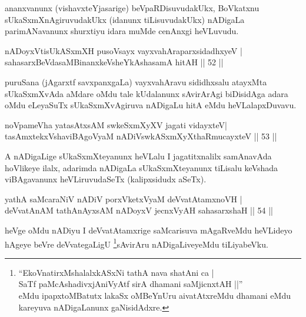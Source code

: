 \begin{artha}
ananxvanunx (vishavxteYjasarige) beVpaRDisuvudakUkx, BoVkatxnu sUkaSxmXnAgiruvudakUkx (idanunx tiLisuvudakUkx) nADigaLa parimANavanunx shurxtiyu idara muMde cenAnxgi heVLuvudu.
\end{artha}

\begin{shl}
nADoyxV\s tisUkASxmXH pusoV\s sayx vayxvahAraparxsidadhxyeV |\\
sahasarxBeVdasaMBinanxkeVsheYkAshasamA hitAH \hfill || 52 || 
\end{shl}

\begin{artha}
puruSana (jAgarxtf savxpanxgaLa) vayxvahAravu sididhxsalu atayxMta sUkaSxmXvAda aMdare oMdu tale kUdalanunx sAvirArAgi biDisidAga adara oMdu eLeyaSuTx sUkaSxmXvAgiruva nADigaLu hitA eMdu heVLalapxDuvavu.
\end{artha}

\begin{shl}
noVpameVha yatasAtxsAM swkeSxmXyXV jagati vidayxteV|\\
tasAmxtekxVshaviBAgoV\s yaM nADiVswkASxmXyXthaRmucayxteV \hfill || 53 || 
\end{shl}

\begin{artha}
A nADigaLige sUkaSxmXteyanunx heVLalu I jagatitxnalilx samAnavAda hoVlikeye ilalx, adarimda nADigaLa sUkaSxmXteyanunx tiLisalu keVshada viBAgavanunx heVLiruvudaSeTx (kalipxsidudx aSeTx).
\end{artha}

\begin{shl}
yathA saMcaraNiV nADiV porxVketxVyaM deVvatAtamxnoVH |\\
deVvatAnAM tathA\s nAyxsAM nADoyxV jecnxVyAH sahasarxshaH \hfill || 54 || 
\end{shl}

\begin{artha}
heVge oMdu nADiyu I deVvatAtamxrige saMcarisuva mAgaRveMdu heVLideyo hAgeye beVre deVvategaLigU \footnote{``EkoVnatirxMshalalxkASxNi tathA nava shatAni ca | \\
SaTf paMcAshadivxjAniVyAtf sirA dhamani saMjicnxtAH ||''\\ eMdu ipapxtoMBatutx lakaSx oMBeYnUru aivatAtxreMdu dhamani eMdu kareyuva nADigaLanunx gaNisidAdxre.}sAvirAru nADigaLiveyeMdu tiLiyabeVku.
\end{artha}


